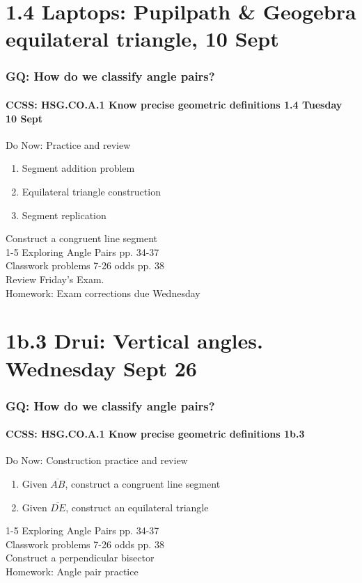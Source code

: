 \documentclass{beamer}
\begin{document}
  \section{1.4 Laptops: Pupilpath \& Geogebra equilateral triangle, 10 Sept}
    \frame
    {
      \frametitle{GQ: How do we classify angle pairs?}
      \framesubtitle{CCSS: HSG.CO.A.1 Know precise geometric definitions \hfill \alert{1.4 Tuesday 10 Sept}}

      \begin{block}{Do Now: Practice and review}
      \begin{enumerate}
          \item Segment addition problem
          \item Equilateral triangle construction
          \item Segment replication
      \end{enumerate}
      \end{block}
      Construct a congruent line segment \\
      1-5 Exploring Angle Pairs pp. 34-37\\
      Classwork problems 7-26 odds pp. 38\\
      Review Friday's Exam.\\
      \vspace{0.5cm}
      Homework: Exam corrections due Wednesday\\
    }


\section{1b.3 Drui: Vertical angles. Wednesday Sept 26}
  \frame
  {
    \frametitle{GQ: How do we classify angle pairs?}
    \framesubtitle{CCSS: HSG.CO.A.1 Know precise geometric definitions  \alert{1b.3}}

    \begin{block}{Do Now: Construction practice and review}
    \begin{enumerate}
        \item Given $\overline{AB}$, construct a congruent line segment
        \item Given $\overline{DE}$, construct an equilateral triangle
    \end{enumerate}
    \end{block}
    1-5 Exploring Angle Pairs pp. 34-37\\
    Classwork problems 7-26 odds pp. 38\\
    Construct a perpendicular bisector \\
    \vspace{0.5cm}
    Homework: Angle pair practice
  }
\end{document}
